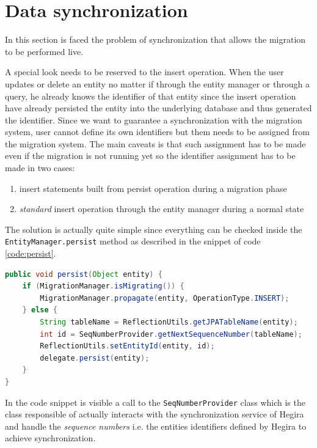 \section{Data synchronization}
\label{sec:synch}
In this section is faced the problem of synchronization that allows the migration to be performed live.

\noindent A special look needs to be reserved to the insert operation. When the user updates or delete an entity no matter if through the entity manager or through a query, he already knows the identifier of that entity since the insert operation have already persisted the entity into the underlying database and thus generated the identifier.
Since we want to guarantee a synchronization with the migration system, user cannot define its own identifiers but them needs to be assigned from the migration system.
The main caveats is that such assignment has to be made even if the migration is not running yet so the identifier assignment has to be made in two cases:
\begin{enumerate}
\item insert statements built from persist operation during a migration phase
\item \textit{standard} insert operation through the entity manager during a normal state
\end{enumerate}

\noindent The solution is actually quite simple since everything can be checked inside the \texttt{EntityManager.persist} method as described in the snippet of code \ref{code:persist}.

\begin{lstlisting}[language=Java, caption=Persist operation, label=code:persist]
public void persist(Object entity) {
    if (MigrationManager.isMigrating()) {
        MigrationManager.propagate(entity, OperationType.INSERT);
    } else {
        String tableName = ReflectionUtils.getJPATableName(entity);
        int id = SeqNumberProvider.getNextSequenceNumber(tableName);
        ReflectionUtils.setEntityId(entity, id);
        delegate.persist(entity);
    }
}
\end{lstlisting}

\noindent In the code snippet is visible a call to the  \texttt{SeqNumberProvider} class which is the class responsible of actually interacts with the synchronization service of Hegira and handle the \textit{sequence numbers} i.e. the entities identifiers defined by Hegira to achieve synchronization. 

